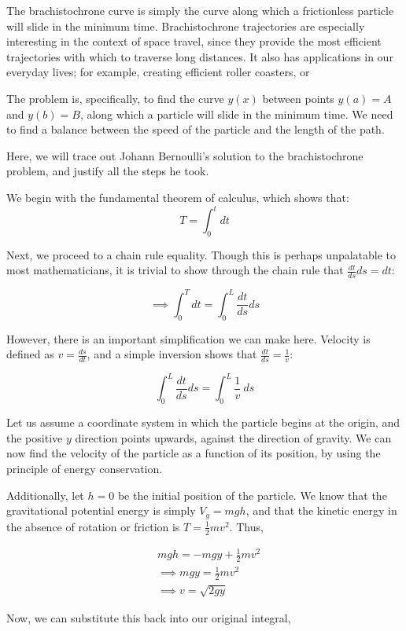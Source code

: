 \documentclass[%
 amsmath,amssymb,
aps,
 fleqn,
 notitlepage,
]{revtex4-2}
\begin{document}
The brachistochrone curve is simply the curve along which a frictionless particle will slide in the minimum time. Brachistochrone trajectories are especially interesting in the context of space travel, since they provide the most efficient trajectories with which to traverse long distances. It also has applications in our everyday lives; for example, creating efficient roller coasters, or 

The problem is, specifically, to find the curve $y(x)$ between points $y(a) = A$ and $y(b) = B$, along which a particle will slide in the minimum time. We need to find a balance between the speed of the particle and the length of the path. 

Here, we will trace out Johann Bernoulli's solution to the brachistochrone problem, and justify all the steps he took.

We begin with the fundamental theorem of calculus, which shows that:
\[T = \int_0^t dt\]

Next, we proceed to a chain rule equality.  Though this is perhaps unpalatable to most mathematicians, it is trivial to show through the chain rule that $\frac{dt}{ds} ds = dt$:

\[\implies \int_0^T dt = \int_0^L \frac{dt}{ds} ds\]

However, there is an important simplification we can make here.  Velocity is defined as $v = \frac{ds}{dt}$, and a simple inversion shows that $\frac{dt}{ds} = \frac 1v$:

\[\int_0^L \frac{dt}{ds} ds = \int_0^L \frac 1v ~ ds\]

Let us assume a coordinate system in which the particle begins at the origin, and the positive $y$ direction points upwards, against the direction of gravity.  We can now find the velocity of the particle as a function of its position, by using the principle of energy conservation.

Additionally, let $h = 0$ be the initial position of the particle.  We know that the gravitational potential energy is simply $V_g = mgh$, and that the kinetic energy in the absence of rotation or friction is $T = \frac12 mv^2$.  Thus,

\begin{align*}
    &mgh = -mgy + \frac12 mv^2\\
    &\implies mgy = \frac12 mv^2\\
    &\implies v = \sqrt{2gy}
\end{align*}

Now, we can substitute this back into our original integral,
\end{document}
